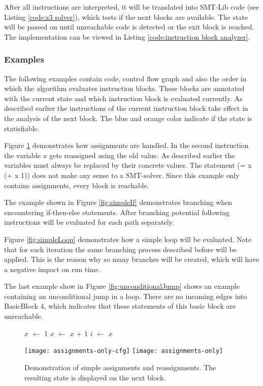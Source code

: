 After all instructions are interpreted, it will be translated into SMT-Lib code (see Listing \ref{code:z3 solver}), which tests if the next blocks are available. 
The state will be passed on until unreachable code is detected or the exit block is reached.
The implementation can be viewed in Listing \ref{code:instruction block analyzer}. 

\subsubsection{Examples}
The following examples contain code, control flow graph and also the order in which the algorithm evaluates instruction blocks. These blocks are annotated with the current state and which instruction block is evaluated currently. As described earlier the instructions of the current instruction block take effect in the analysis of the next block. The blue and orange color indicate if the state is statisfiable.


Figure \ref{fig:assignmentOnly} demonstrates how assignments are handled. In the second instruction the variable $x$ gets reassigned using the old value.
As described earlier the variables must always be replaced by their concrete values. The statement (= x (+ x 1)) does not make any sense to a SMT-solver. 
Since this example only contains assignments, every block is reachable.


The example shown in Figure \ref{fig:simpleIf} demonstrates branching when encountering if-then-else statements. After branching potential following instructions will be evaluated for each path separately. 


Figure \ref{fig:simpleLoop} demonstrates how a simple loop will be evaluated. Note that for each iteration the same branching process described before will be applied. 
This is the reason why so many branches will be created, which will have a negative impact on run time.


The last example show in Figure \ref{fig:unconditionalJump} shows an example containing an unconditional jump in a loop. There are no incoming edges into BasicBlock 4, which indicates that these statements of this basic block are unreachable.

\begin{figure}[!h]
	\begin{GenericCode}
		$x$ $\leftarrow$ 1
		$x$ $\leftarrow$ $x$ + 1
		$i$ $\leftarrow$ $x$
	\end{GenericCode}
	\centering
	\texttt{[image: assignments-only-cfg]}
	\texttt{[image: assignments-only]}
	\caption{Demonstration of simple assignments and reassignments. The resulting state is displayed on the next block.}
	\label{fig:assignmentOnly}
\end{figure}

